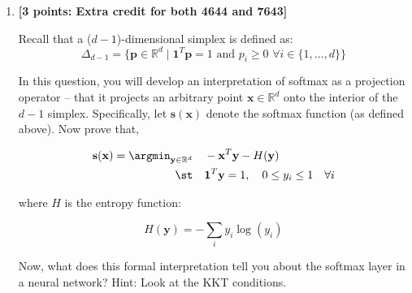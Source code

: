 \documentclass[11pt,english]{article}
\begin{document}
\begin{enumerate}
Explicitly written for the diagonal and off-diagonal elements:
\begin{equation}
    \frac{\partial s_i}{\partial z_j} = \begin{cases} 
    s_i (1 - s_i) & \text{if } i = j \\ 
    -s_i s_j & \text{if } i \neq j 
    \end{cases}
\end{equation}

In compact matrix notation, the Jacobian matrix is given by:
\begin{equation}
    \frac{\partial \mathbf{s}}{\partial \mathbf{z}} = \operatorname{diag}(\mathbf{s}) - \mathbf{s} \mathbf{s}^T
\end{equation}
where $\operatorname{diag}(\mathbf{s})$ is the $K \times K$ diagonal matrix containing vector $\mathbf{s}$ on its diagonal.

\newpage

\item
\textbf{[3 points: Extra credit for both 4644 and 7643]}

Recall that a ($d-1$)-dimensional simplex is defined as: 
\begin{equation}
    \Delta_{d - 1} = \{\mathbf{p} \in \mathbb{R}^{d} \mid \mathbf{1}^{T}\mathbf{p} = 1 \text{ and } p_i \ge 0 \,\, \forall i \in \{1,\ldots,d\} \}
\end{equation}

In this question, you will develop an interpretation of softmax as a projection operator -- that it projects an arbitrary point $\mathbf{x} \in \mathbb{R}^d$ onto the interior of the $d - 1$ simplex. Specifically, let $\mathbf{s}(\mathbf{x})$ denote the softmax function (as defined above). Now prove that, 


\begin{align}
    \mathbf{s}(\mathbf{x}) =  \argmin_{\mathbf{y} \in \mathbb{R}^d} &\quad  -\mathbf{x}^{T}\mathbf{y} - H(\mathbf{y}) \\ 
     \st & \quad \mathbf{1}^{T}\mathbf{y} = 1, \quad 0 \le y_i \le 1 \quad \forall i
\end{align}

where $H$ is the entropy function: 

\begin{equation}
    H(\mathbf{y}) = - \sum_{i}y_{i}\log(y_{i})
\end{equation}

Now, what does this formal interpretation tell you about the softmax layer in a neural network? 
Hint: Look at the KKT conditions.


\end{enumerate}
\end{document}
